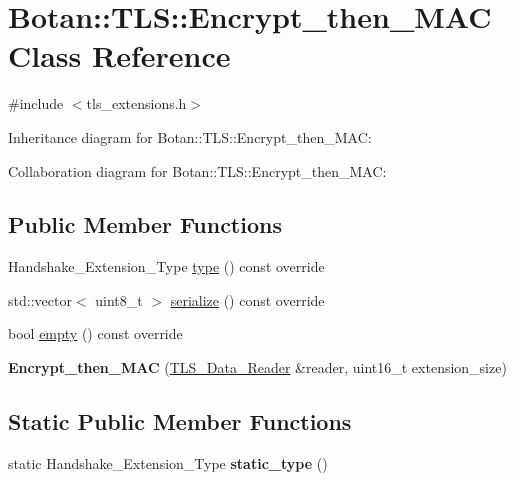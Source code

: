 \hypertarget{class_botan_1_1_t_l_s_1_1_encrypt__then___m_a_c}{}\section{Botan\+:\+:T\+LS\+:\+:Encrypt\+\_\+then\+\_\+\+M\+AC Class Reference}
\label{class_botan_1_1_t_l_s_1_1_encrypt__then___m_a_c}


{\ttfamily \#include $<$tls\+\_\+extensions.\+h$>$}



Inheritance diagram for Botan\+:\+:T\+LS\+:\+:Encrypt\+\_\+then\+\_\+\+M\+AC\+:


Collaboration diagram for Botan\+:\+:T\+LS\+:\+:Encrypt\+\_\+then\+\_\+\+M\+AC\+:
\subsection*{Public Member Functions}
\begin{DoxyCompactItemize}
\item 
Handshake\+\_\+\+Extension\+\_\+\+Type \mbox{\hyperlink{class_botan_1_1_t_l_s_1_1_encrypt__then___m_a_c_a56854b4e65b0cf1395b3b053df42f4f3}{type}} () const override
\item 
std\+::vector$<$ uint8\+\_\+t $>$ \mbox{\hyperlink{class_botan_1_1_t_l_s_1_1_encrypt__then___m_a_c_a599289acb3fc84c9e34a1dee1345904e}{serialize}} () const override
\item 
bool \mbox{\hyperlink{class_botan_1_1_t_l_s_1_1_encrypt__then___m_a_c_af8412e160e798f87de854889a66faec5}{empty}} () const override
\item 
\mbox{\label{class_botan_1_1_t_l_s_1_1_encrypt__then___m_a_c_afe72de65403f8f85c96203ed19f3309b}} 
{\bfseries Encrypt\+\_\+then\+\_\+\+M\+AC} (\mbox{\hyperlink{class_botan_1_1_t_l_s_1_1_t_l_s___data___reader}{T\+L\+S\+\_\+\+Data\+\_\+\+Reader}} \&reader, uint16\+\_\+t extension\+\_\+size)
\end{DoxyCompactItemize}
\subsection*{Static Public Member Functions}
\begin{DoxyCompactItemize}
\item 
\mbox{\label{class_botan_1_1_t_l_s_1_1_encrypt__then___m_a_c_a8abfc8a29dfce0ea83d6d1d6e98a6481}} 
static Handshake\+\_\+\+Extension\+\_\+\+Type {\bfseries static\+\_\+type} ()
\end{DoxyCompactItemize}


